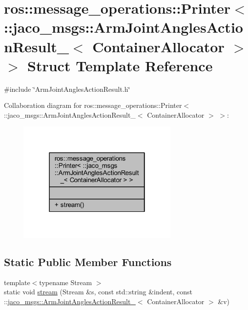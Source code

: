 \hypertarget{structros_1_1message__operations_1_1Printer_3_01_1_1jaco__msgs_1_1ArmJointAnglesActionResult___3_01ContainerAllocator_01_4_01_4}{}\section{ros\+:\+:message\+\_\+operations\+:\+:Printer$<$ \+:\+:jaco\+\_\+msgs\+:\+:Arm\+Joint\+Angles\+Action\+Result\+\_\+$<$ Container\+Allocator $>$ $>$ Struct Template Reference}
\label{structros_1_1message__operations_1_1Printer_3_01_1_1jaco__msgs_1_1ArmJointAnglesActionResult___3_01ContainerAllocator_01_4_01_4}


{\ttfamily \#include \char`\"{}Arm\+Joint\+Angles\+Action\+Result.\+h\char`\"{}}



Collaboration diagram for ros\+:\+:message\+\_\+operations\+:\+:Printer$<$ \+:\+:jaco\+\_\+msgs\+:\+:Arm\+Joint\+Angles\+Action\+Result\+\_\+$<$ Container\+Allocator $>$ $>$\+:
\nopagebreak
\begin{figure}[H]
\begin{center}
\leavevmode
\includegraphics[width=226pt]{d2/deb/structros_1_1message__operations_1_1Printer_3_01_1_1jaco__msgs_1_1ArmJointAnglesActionResult___30c1978640f764289ddf406dd54034df1}
\end{center}
\end{figure}
\subsection*{Static Public Member Functions}
\begin{DoxyCompactItemize}
\item 
{\footnotesize template$<$typename Stream $>$ }\\static void \hyperlink{structros_1_1message__operations_1_1Printer_3_01_1_1jaco__msgs_1_1ArmJointAnglesActionResult___3_01ContainerAllocator_01_4_01_4_a84ef1e26ad4c49c3b45441133f02b86a}{stream} (Stream \&s, const std\+::string \&indent, const \+::\hyperlink{structjaco__msgs_1_1ArmJointAnglesActionResult__}{jaco\+\_\+msgs\+::\+Arm\+Joint\+Angles\+Action\+Result\+\_\+}$<$ Container\+Allocator $>$ \&v)
\end{DoxyCompactItemize}


